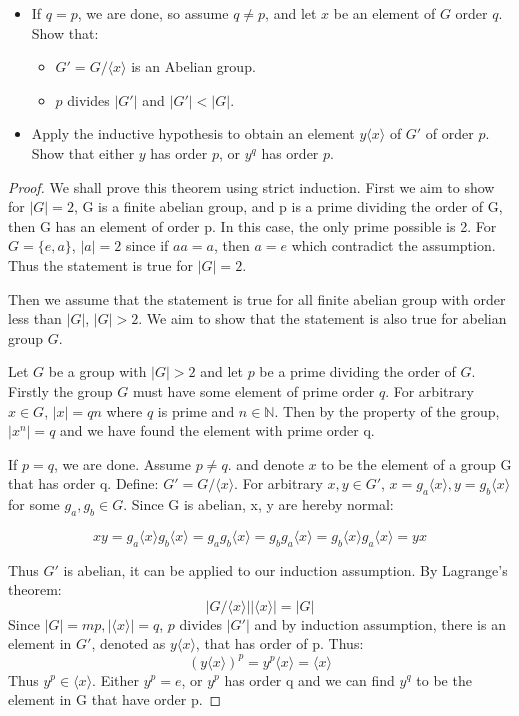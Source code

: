 \documentclass[11pt, oneside]{article}
\newcommand{\N}{\mathbb N}
\begin{document}
\begin{enumerate}
\begin{itemize}
\item If $q=p$, we are done, so assume $q\neq p$, and let $x$ be an element of $G$ order $q$. Show that: 
\begin{itemize}
\item $G'=G/\langle x\rangle$ is an Abelian group.
\item $p$ divides $|G'|$ and $|G'|<|G|$.
\end{itemize}

\item Apply the inductive hypothesis to obtain an element $y\langle x\rangle$ of $G'$ of order $p$. Show that either $y$ has order $p$, or $y^q$ has order $p$.


\end{itemize}
\begin{proof}
We shall prove this theorem using strict induction. First we aim to show for $|G|=2$, G is a finite abelian group, and p is a prime dividing the order of G, then G has an element of order p. In this case, the only prime possible is 2. For $G=\{e, a\}$, $|a|=2$ since if $aa= a$, then $a=e$ which contradict the assumption. Thus the statement is true for $|G|=2$.

Then we assume that the statement is true for all finite abelian group with order less than $|G|$, $|G|>2$. We aim to show that the statement is also true for abelian group $G$. 

Let $G$ be a group with $|G|>2$ and let $p$ be a prime dividing the order of $G$. Firstly the group $G$ must have some element of prime order $q$. For arbitrary $x\in G$, $|x|=qn$ where $q$ is prime and $n\in \N$. Then by the property of the group, $|x^n|=q$ and we have found the element with prime order q.

If $p=q$, we are done. Assume $p\neq q$. and denote $x$ to be the element of a group G that has order q. Define: $G'=G/\langle x\rangle$. For arbitrary $x,y \in G'$, $x=g_a\langle x\rangle, y=g_b\langle x\rangle$ for some $g_a, g_b\in G$. Since G is abelian, x, y are hereby normal:

\[xy= g_a\langle x\rangle g_b\langle x\rangle=g_a g_b\langle x\rangle= g_bg_a\langle x\rangle =g_b\langle x\rangle g_a\langle x\rangle=yx\]

Thus $G'$ is abelian, it can be applied to our induction assumption. By Lagrange's theorem:
\[|G/\langle x\rangle||\langle x\rangle|=|G|\]
Since $|G|=mp, |\langle x\rangle|=q$, $p$ divides $|G'|$ and by induction assumption, there is an element in $G'$, denoted as $y\langle x\rangle$, that has order of p. Thus:
\[(y\langle x\rangle)^p=y^p\langle x\rangle=\langle x\rangle\]
Thus $y^p\in\langle x\rangle$. Either $y^p=e$, or $y^p$ has order q and we can find $y^q$ to be the element in G that have order p.

\end{proof}

\end{enumerate}
\end{document}
